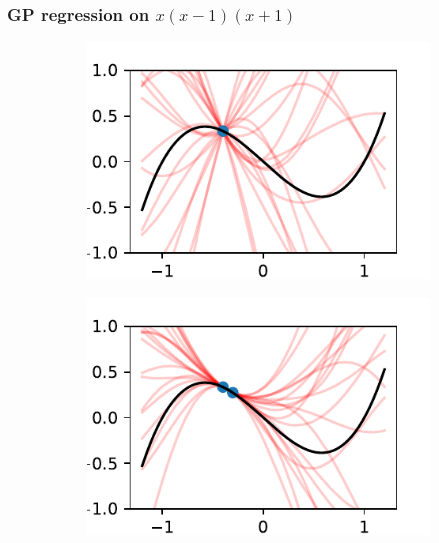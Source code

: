 \documentclass{beamer}
\begin{document}
\begin{frame}
    \frametitle{GP regression on $x(x-1)(x+1)$}
    \begin{figure}
        \centering
        \begin{subfigure}[t]{0.4\textwidth}
            \centering
            \includegraphics[width=\textwidth]{cub_GP_1_iters.pdf}
        \end{subfigure}%
        \begin{subfigure}[t]{0.4\textwidth}
            \centering
            \includegraphics[width=\textwidth]{cub_GP_2_iters.pdf}
        \end{subfigure}
        \begin{subfigure}[t]{0.4\textwidth}
            \centering

\end{subfigure}
\end{figure}
\end{frame}
\end{document}
